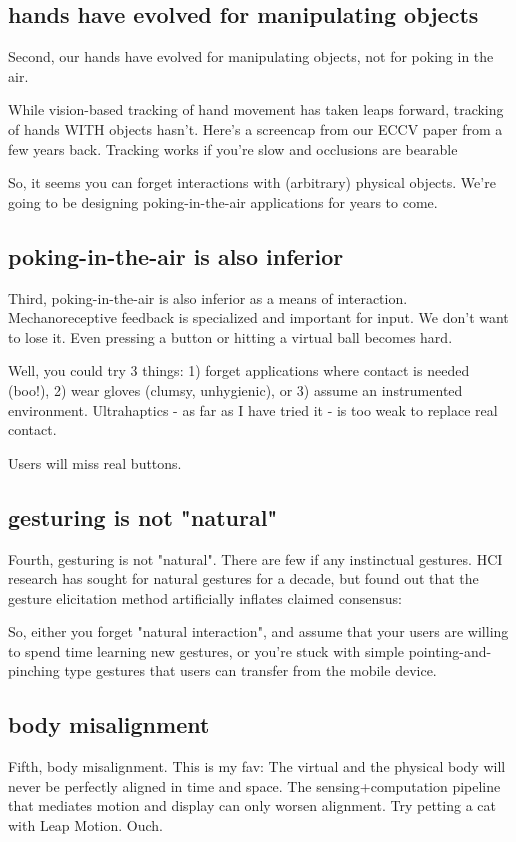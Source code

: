 \subsection{hands have evolved for manipulating objects}
Second, our hands have evolved for manipulating objects, not for poking in the air. 


While vision-based tracking of hand movement has taken leaps forward, tracking of hands WITH objects hasn't. Here's a screencap from our ECCV paper from a few years back. Tracking works if you're slow and occlusions are bearable


So, it seems you can forget interactions with (arbitrary) physical objects. We're going to be designing poking-in-the-air applications for years to come. 

\subsection{poking-in-the-air is also inferior}
Third, poking-in-the-air is also inferior as a means of interaction. Mechanoreceptive feedback is specialized and important for input. We don't want to lose it. Even pressing a button or hitting a virtual ball becomes hard. 

Well, you could try 3 things: 1) forget applications where contact is needed (boo!), 2) wear gloves (clumsy, unhygienic), or 3) assume an instrumented environment. Ultrahaptics - as far as I have tried it - is too weak to replace real contact. 

Users will miss real buttons. 


\subsection{gesturing is not "natural"}
Fourth, gesturing is not "natural". There are few if any instinctual gestures. HCI research has sought for natural gestures for a decade, but found out that the gesture elicitation method artificially inflates claimed consensus: 

So, either you forget "natural interaction", and assume that your users are willing to spend time learning new gestures, or you're stuck with simple pointing-and-pinching type gestures that users can transfer from the mobile device.



\subsection{body misalignment}
Fifth, body misalignment. This is my fav: The virtual and the physical body will never be perfectly aligned in time and space. The sensing+computation pipeline that mediates motion and display can only worsen alignment. Try petting a cat with Leap Motion. Ouch.

